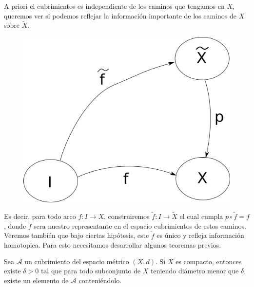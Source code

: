 A priori el cubrimientos es independiente de los caminos que tengamos
en \(X\), queremos ver si podemos reflejar la información importante de
los caminos de \(X\) sobre \(\tilde{X}\).
\begin{figure}[h]
  \centering
  \includegraphics[scale=0.3]{./imagenes/lifting-path.png}
\end{figure}
Es decir, para todo arco \(f : I \to X\), construiremos \(\tilde f : I
\to \tilde X\) el cual cumpla \(p \circ \tilde f = f \), donde \(\tilde
f\) sera nuestro representante en el espacio cubrimientos de estos
caminos. Veremos también que bajo ciertas hipótesis, este \(\tilde f\)
es único y refleja información homotopica. Para esto necesitamos
desarrollar algunos teoremas previos.
\begin{lema} \label{thm:lebesgue-number-lema}
  Sea \(\mathcal A\) un cubrimiento del espacio métrico \((X,d)\). Si
  \(X\) es compacto, entonces existe \(\delta > 0\) tal que para todo
  subconjunto de \(X\) teniendo diámetro menor que \(\delta\), existe un
  elemento de \(\mathcal A\) conteniéndolo.
\end{lema}
